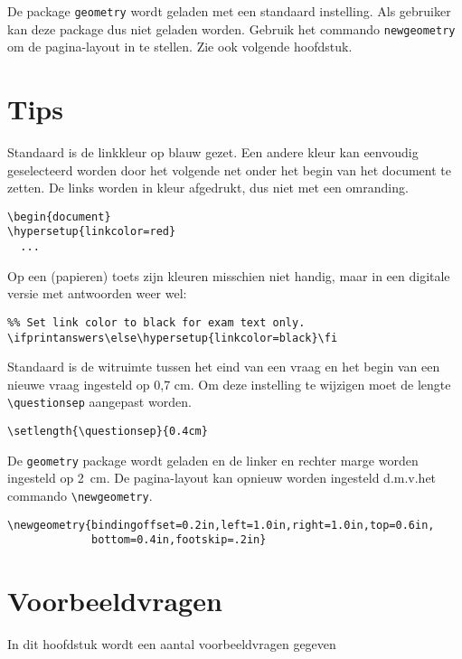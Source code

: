 \documentclass[dutch,a4paper,12pt,addpoints,fleqn,oneside]{tisdexam}
\begin{document}
\medskip
De package \verb|geometry| wordt geladen met een standaard instelling. Als
gebruiker kan deze package dus niet geladen worden. Gebruik het commando
\verb|newgeometry| om de pagina-layout in te stellen. Zie ook volgende
hoofdstuk.


\section{Tips}
Standaard is de linkkleur op blauw gezet. Een andere kleur kan eenvoudig
geselecteerd worden door het volgende net onder het begin van het document
te zetten. De links worden in kleur afgedrukt, dus niet met een omranding.

\begin{lstlisting}
\begin{document}
\hypersetup{linkcolor=red}
  ...
\end{lstlisting}

\medskip
Op een (papieren) toets zijn kleuren misschien niet handig, maar in een
digitale versie met antwoorden weer wel:

\begin{lstlisting}
%% Set link color to black for exam text only.
\ifprintanswers\else\hypersetup{linkcolor=black}\fi
\end{lstlisting}

\medskip
Standaard is de witruimte tussen het eind van een vraag en het begin van een
nieuwe vraag ingesteld op 0,7 cm. Om deze instelling te wijzigen moet de
lengte \verb|\questionsep| aangepast worden.

\begin{lstlisting}
\setlength{\questionsep}{0.4cm}
\end{lstlisting}

\medskip
De \verb|geometry| package wordt geladen en de linker en rechter marge worden
ingesteld op 2~cm. De pagina-layout kan opnieuw worden ingesteld
d.m.v.\@ het commando \verb|\newgeometry|.

\begin{lstlisting}
\newgeometry{bindingoffset=0.2in,left=1.0in,right=1.0in,top=0.6in,
             bottom=0.4in,footskip=.2in}
\end{lstlisting}

\section{Voorbeeldvragen}
In dit hoofdstuk wordt een aantal voorbeeldvragen gegeven
\end{document}
